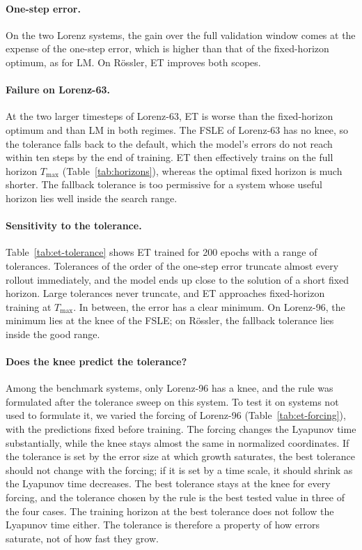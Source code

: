 \documentclass{article}
\begin{document}
\paragraph{One-step error.}
On the two Lorenz systems, the gain over the full validation window comes at the expense of the one-step error, which is higher than that of the fixed-horizon optimum, as for LM. On Rössler, ET improves both scopes.

\paragraph{Failure on Lorenz-63.}
At the two larger timesteps of Lorenz-63, ET is worse than the fixed-horizon optimum and than LM in both regimes. The FSLE of Lorenz-63 has no knee, so the tolerance falls back to the default, which the model's errors do not reach within ten steps by the end of training. ET then effectively trains on the full horizon $T_{\max}$ (Table~\ref{tab:horizons}), whereas the optimal fixed horizon is much shorter. The fallback tolerance is too permissive for a system whose useful horizon lies well inside the search range.



\paragraph{Sensitivity to the tolerance.}
Table~\ref{tab:et-tolerance} shows ET trained for 200 epochs with a range of tolerances. Tolerances of the order of the one-step error truncate almost every rollout immediately, and the model ends up close to the solution of a short fixed horizon. Large tolerances never truncate, and ET approaches fixed-horizon training at $T_{\max}$. In between, the error has a clear minimum. On Lorenz-96, the minimum lies at the knee of the FSLE; on Rössler, the fallback tolerance lies inside the good range.



\paragraph{Does the knee predict the tolerance?}
Among the benchmark systems, only Lorenz-96 has a knee, and the rule was formulated after the tolerance sweep on this system. To test it on systems not used to formulate it, we varied the forcing of Lorenz-96 (Table~\ref{tab:et-forcing}), with the predictions fixed before training. The forcing changes the Lyapunov time substantially, while the knee stays almost the same in normalized coordinates. If the tolerance is set by the error size at which growth saturates, the best tolerance should not change with the forcing; if it is set by a time scale, it should shrink as the Lyapunov time decreases. The best tolerance stays at the knee for every forcing, and the tolerance chosen by the rule is the best tested value in three of the four cases. The training horizon at the best tolerance does not follow the Lyapunov time either. The tolerance is therefore a property of how errors saturate, not of how fast they grow.
\end{document}
